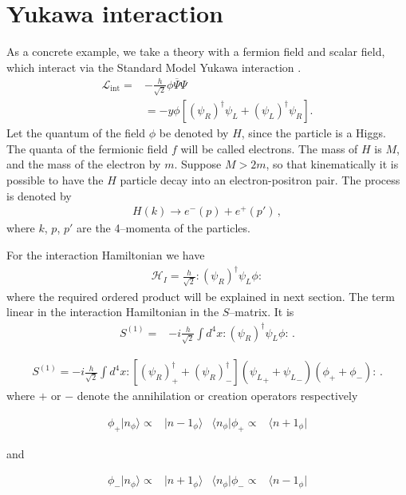 \section{Yukawa interaction}
\label{sec:feynman-diagrams}
As a concrete example, we take a theory with a fermion field and scalar field, which interact via the Standard Model Yukawa interaction \cite{Lahiri:2005sm}. 
\begin{align}
\label{eq:lppp}
  \mathcal{L}_{\text{int}}=&-\frac{h}{\sqrt{2}}\phi\overline{\Psi}\Psi \nonumber\\
&=-y \phi \left[\left( \psi_R \right)^{\dagger}\psi_L+\left(\psi_L \right)^{\dagger}\psi_R  \right].
\end{align}
Let the quantum of the field $\phi$ be denoted by $H$, since the particle is a Higgs. The quanta of the fermionic field $f$ will be called electrons. The mass of $H$ is $M$, and the mass of the electron by $m$. Suppose $M\gt 2m$,  so that kinematically it is possible to have the $H$ particle decay into an electron-positron pair. The process is denoted by
\begin{align}
  H(k)\to e^-(p)+e^+(p')\,,
\end{align}
where $k$, $p$, $p'$ are the 4--momenta of the particles.

For the interaction Hamiltonian we have
\begin{align}
\label{eq:hppp}
  \mathcal{H}_I=\frac{h}{\sqrt{2}}:(\psi_R)^{\dagger}{\psi_L}\phi:
\end{align}
where the required ordered product will be explained in next section.
The term linear in the interaction Hamiltonian in the $S$--matrix.  It is
\begin{align}
  S^{(1)}=&-i \frac{h}{\sqrt{2}} \int d^4x:(\psi_R)^{\dagger}{\psi_L}\phi:\,.
\end{align}

\begin{align}
  S^{(1)}=-i \frac{h}{\sqrt{2}} \int d^4x:[(\psi_R)^{\dagger}_++(\psi_R)^{\dagger}_-]({\psi_L}_++{\psi_L}_-)(\phi_++\phi_-):\,.
\end{align}
where $+$ or $-$ denote the annihilation or creation operators respectively

\begin{align}
 \phi_{+} | n_{\phi} \rangle  \propto& |n-1_{\phi}\rangle & \langle n_{\phi}|\phi_{+} \propto& \langle n+1_{\phi}|
\end{align}

and

\begin{align}
 \phi_{-} |n_{\phi}\rangle  \propto& |n+1_{\phi}\rangle&  \langle n_{\phi}| \phi_{-} \propto& \langle n-1_{\phi}|
\end{align}

